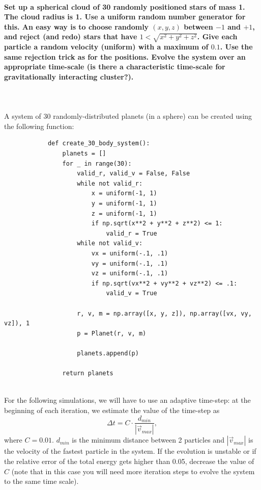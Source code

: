     \paragraph{Set up a spherical cloud of 30 randomly positioned stars of 
        mass 1. The cloud radius is 1. Use a uniform random number generator 
        for this. An easy way is to choose randomly $(x,y,z)$ between 
        $-1$ and $+1$, and reject (and redo) stars that have 
        $1<\sqrt{x^2+y^2+z^2}$. Give each particle a random velocity
        (uniform) with a maximum of $0.1$. Use the same rejection trick as for 
        the positions. Evolve the system over an appropriate time-scale 
        (is there a characteristic time-scale for gravitationally interacting
        cluster?). 
    } \ \\
        \\
        A system of 30 randomly-distributed planets (in a sphere) can 
        be created using the following function:
        \begin{lstlisting}
            def create_30_body_system():
                planets = []
                for _ in range(30):
                    valid_r, valid_v = False, False
                    while not valid_r:
                        x = uniform(-1, 1)
                        y = uniform(-1, 1)
                        z = uniform(-1, 1)
                        if np.sqrt(x**2 + y**2 + z**2) <= 1:
                            valid_r = True
                    while not valid_v:
                        vx = uniform(-.1, .1)
                        vy = uniform(-.1, .1)
                        vz = uniform(-.1, .1)
                        if np.sqrt(vx**2 + vy**2 + vz**2) <= .1:
                            valid_v = True
            
                    r, v, m = np.array([x, y, z]), np.array([vx, vy, vz]), 1
                    p = Planet(r, v, m)
            
                    planets.append(p)
            
                return planets \end{lstlisting} \ \\
        For the following simulations, we will have to use an adaptive 
        time-step: at the beginning of each iteration, we estimate the 
        value of the time-step as 
        \begin{equation}
            \Delta t = C\cdot\frac{d_{min}}{|\vec v_{max}|},
        \end{equation}
        where $C=0.01$. $d_{min}$ is the minimum distance between 2 particles 
        and $|\vec v_{max}|$ is the velocity of the fastest particle in the 
        system. If the evolution is unstable or if the relative error of the 
        total energy gets higher than 0.05, decrease the value of $C$ (note 
        that in this case you will need more iteration steps to evolve the 
        system to the same time scale).

